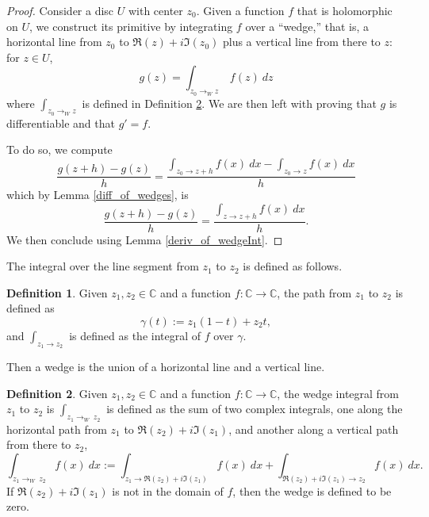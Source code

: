 \documentclass{report}
\theoremstyle{definition}
\newtheorem{definition}{Definition}
\begin{document}
\begin{proof}
  Consider a disc $U$ with center $z_0$.
  Given a function $f$ that is holomorphic on $U$, we construct its primitive by integrating $f$ over a ``wedge,'' that is, a horizontal line from $z_0$ to $ \Re(z)+ i \Im(z_0)$ plus a vertical line from there to $z$: for $z\in U$,
  \begin{equation}
    g(z)=\int_{z_0\to_W z}\ f(z)\ dz
  \end{equation}
  where $\int_{z_0\to_W z}$ is defined in Definition \ref{WedgeInt}.
  We are then left with proving that $g$ is differentiable and that $g'=f$.

  To do so, we compute
  \begin{equation}
    \frac{g(z+h)-g(z)}h
    =
    \frac{\int_{z_0\to z+h} f(x)\ dx-\int_{z_0\to z} f(x)\ dx}h
  \end{equation}
  which by Lemma \ref{diff_of_wedges}, is
  \begin{equation}
    \frac{g(z+h)-g(z)}h
    =
    \frac{\int_{z\to z+h} f(x)\ dx}h
    .
  \end{equation}
  We then conclude using Lemma \ref{deriv_of_wedgeInt}.
\end{proof}

The integral over the line segment from $z_1$ to $z_2$ is defined as follows.

\begin{definition}
  \label{linint}
  \leanok
  Given $z_1,z_2\in\mathbb C$ and a function $f:\mathbb C\to\mathbb C$, the path from $z_1$ to $z_2$ is defined as
  \begin{equation}
    \gamma(t):=z_1(1-t)+z_2 t,
  \end{equation}
  and $\int_{z_1\to z_2}$ is defined as the integral of $f$ over $\gamma$.
\end{definition}

Then a wedge is the union of a horizontal line and a vertical line.

\begin{definition}
  \label{WedgeInt}
  \leanok
  Given $z_1,z_2\in\mathbb C$ and a function $f:\mathbb C\to\mathbb C$, the wedge integral from $z_1$ to $z_2$ is 
   $\int_{z_1\to_W\  z_2}$ is defined as the sum of two  complex integrals, one along the horizontal path from $z_1$ to $\Re(z_2)+i \Im(z_1)$, and another along a vertical path from there to $z_2$,
   \begin{equation}
      \int_{z_1\to_W\  z_2} f(x)\ dx
      :=
      \int_{z_1\to\Re(z_2)+i \Im(z_1)} f(x)\ dx
      +
      \int_{\Re(z_2)+i \Im(z_1)\to z_2} f(x)\ dx
      .
   \end{equation}
   If $\Re(z_2)+i \Im(z_1)$ is not in the domain of $f$, then the wedge is defined to be zero.
\end{definition}
\end{document}
